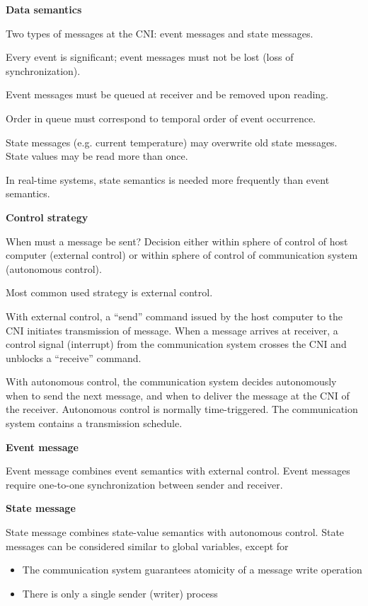 \textbf{Data semantics}

Two types of messages at the CNI: event messages and state messages.

Every event is significant; event messages must not be lost (loss of
synchronization).

Event messages must be queued at receiver and be removed upon reading.

Order in queue must correspond to temporal order of event occurrence.

State messages (e.g. current temperature) may overwrite old state
messages. State values may be read more than once.

In real-time systems, state semantics is needed more frequently than
event semantics.

\textbf{Control strategy}

When must a message be sent? Decision either within sphere of control of
host computer (external control) or within sphere of control of
communication system (autonomous control).

Most common used strategy is external control.

With external control, a ``send'' command issued by the host computer to
the CNI initiates transmission of message. When a message arrives at
receiver, a control signal (interrupt) from the communication system
crosses the CNI and unblocks a ``receive'' command.

With autonomous control, the communication system decides autonomously
when to send the next message, and when to deliver the message at the
CNI of the receiver. Autonomous control is normally time-triggered. The
communication system contains a transmission schedule.

\textbf{Event message}

Event message combines event semantics with external control. Event
messages require one-to-one synchronization between sender and receiver.

\textbf{State message}

State message combines state-value semantics with autonomous control.
State messages can be considered similar to global variables, except for

\begin{itemize}
\item
  The communication system guarantees atomicity of a message write
  operation
\item
  There is only a single sender (writer) process
\end{itemize}

